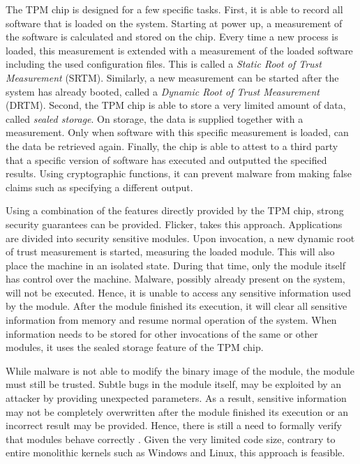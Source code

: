 The TPM chip is designed for a few specific tasks. First, it is able to record all software that is loaded on the system. Starting at power up, a measurement of the software is calculated and stored on the chip. Every time a new process is loaded, this measurement is extended with a measurement of the loaded software including the used configuration files. This is called a {\em Static Root of Trust Measurement} (SRTM). Similarly, a new measurement can be started after the system has already booted, called a {\em Dynamic Root of Trust Measurement} (DRTM).
Second, the TPM chip is able to store a very limited amount of data, called {\em sealed storage}. On storage, the data is supplied together with a measurement. Only when software with this specific measurement is loaded, can the data be retrieved again.
Finally, the chip is able to attest to a third party that a specific version of software has executed and outputted the specified results. Using cryptographic functions, it can prevent malware from making false claims such as specifying a different output.







Using a combination of the features directly provided by the TPM chip, strong security guarantees can be provided. Flicker\citep{mccune2008Flicker}, takes this approach. Applications are divided into security sensitive modules. Upon invocation, a new dynamic root of trust measurement is started, measuring the loaded module. This will also place the machine in an isolated state. During that time, only the module itself has control over the machine. Malware, possibly already present on the system, will not be executed. Hence, it is unable to access any sensitive information used by the module. After the module finished its execution, it will clear all sensitive information from memory and resume normal operation of the system. When information needs to be stored for other invocations of the same or other modules, it uses the sealed storage feature of the TPM chip.

While malware is not able to modify the binary image of the module, the module must still be trusted. Subtle bugs in the module itself, may be exploited by an attacker by providing unexpected parameters. As a result, sensitive information may not be completely overwritten after the module finished its execution or an incorrect result may be provided. Hence, there is still a need to formally verify that modules behave correctly \citep{jacobs2008verifast}. Given the very limited code size, contrary to entire monolithic kernels such as Windows and Linux, this approach is feasible.

